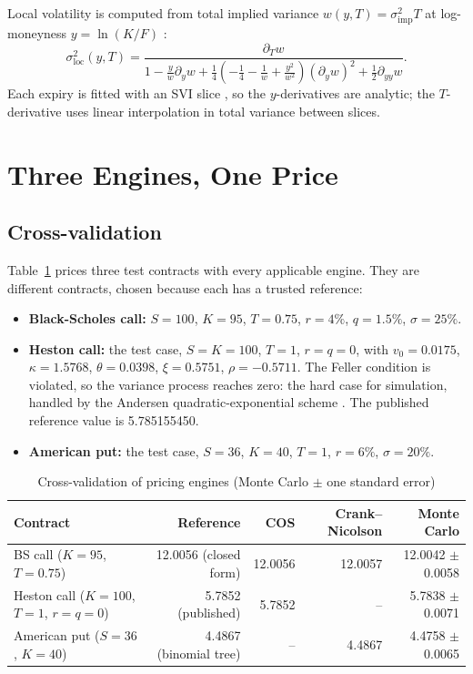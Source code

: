 \documentclass[10pt,letterpaper]{article}
\begin{document}
Local volatility is computed from total implied variance $w(y,T)=\sigma_{\text{imp}}^2T$ at log-moneyness
$y=\ln(K/F)$ \citep{gatheral2006}:
\begin{equation}
\sigma_{\text{loc}}^2(y,T) = \frac{\partial_T w}{1 - \frac{y}{w}\partial_y w
+ \frac14\left(-\frac14 - \frac1w + \frac{y^2}{w^2}\right)(\partial_y w)^2 + \frac12\partial_{yy} w}.
\end{equation}
Each expiry is fitted with an SVI slice \citep{gatheral2014}, so the $y$-derivatives are analytic; the
$T$-derivative uses linear interpolation in total variance between slices.

\section{Three Engines, One Price}\label{sec:engines}
\subsection{Cross-validation}
Table~\ref{tab:xval} prices three test contracts with every applicable engine. They are different contracts,
chosen because each has a trusted reference:
\begin{itemize}
\item \textbf{Black-Scholes call:} $S=100$, $K=95$, $T=0.75$, $r=4\%$, $q=1.5\%$, $\sigma=25\%$.
\item \textbf{Heston call:} the \citet{fang2008} test case, $S=K=100$, $T=1$, $r=q=0$, with $v_0=0.0175$,
$\kappa=1.5768$, $\theta=0.0398$, $\xi=0.5751$, $\rho=-0.5711$. The Feller condition is violated, so the variance
process reaches zero: the hard case for simulation, handled by the Andersen quadratic-exponential scheme
\citep{andersen2008}. The published reference value is 5.785155450.
\item \textbf{American put:} the \citet{longstaff2001} test case, $S=36$, $K=40$, $T=1$, $r=6\%$, $\sigma=20\%$.
\end{itemize}

\begin{table}[H]
\caption{Cross-validation of pricing engines (Monte Carlo $\pm$ one standard error)}\label{tab:xval}
\centering\small
\begin{tabular}{lrrrr}
\toprule
\textbf{Contract} & \textbf{Reference} & \textbf{COS} & \textbf{Crank--Nicolson} & \textbf{Monte Carlo}\\
\midrule
BS call ($K=95$, $T=0.75$) & 12.0056 (closed form) & 12.0056 & 12.0057 & 12.0042 $\pm$ 0.0058\\
Heston call ($K=100$, $T=1$, $r=q=0$) & 5.7852 (published) & 5.7852 & -- & 5.7838 $\pm$ 0.0071\\
American put ($S=36$, $K=40$) & 4.4867 (binomial tree) & -- & 4.4867 & 4.4758 $\pm$ 0.0065\\
\bottomrule
\end{tabular}
\end{table}
\end{document}
